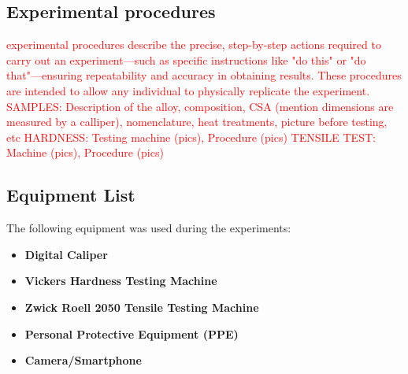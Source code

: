 \documentclass{article}
\begin{document}
\subsection{Experimental procedures}
\textcolor{red}{experimental procedures describe the precise, step-by-step actions required to carry out an experiment—such as specific instructions like "do this" or "do that"—ensuring repeatability and accuracy in obtaining results. These procedures are intended to allow any individual to physically replicate the experiment.\\
SAMPLES: Description of the alloy, composition, CSA (mention dimensions are measured by a calliper), nomenclature, heat treatments, picture before testing, etc
HARDNESS: Testing machine (pics), Procedure (pics)
TENSILE TEST: Machine (pics), Procedure (pics)}\\


\subsection{Equipment List}
The following equipment was used during the experiments:
\begin{itemize}
    \item \textbf{Digital Caliper}
    \item \textbf{Vickers Hardness Testing Machine}
    \item \textbf{Zwick Roell 2050 Tensile Testing Machine}
    \item \textbf{Personal Protective Equipment (PPE)}
    \item \textbf{Camera/Smartphone}
\end{itemize}
\end{document}
